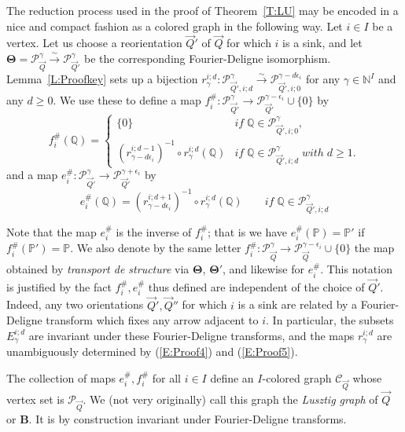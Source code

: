 \documentclass[a4paper,10pt]{amsart}
\def\N{\mathbb{N}}
\def\FD{\boldsymbol{\Theta}}
\numberwithin{equation}{section}
\begin{document}
The reduction process used in the proof of Theorem~\ref{T:LU} may be encoded in a nice and compact fashion as a colored graph in the following way. Let $i \in I$ be a vertex. Let us choose a reorientation $\vec{Q}'$ of $\vec{Q}$ for which $i$ is a sink, and let $\FD=\mathcal{P}_{\vec{Q}}^{\gamma} \stackrel{\sim}{\to} \mathcal{P}_{\vec{Q}'}^{\gamma}$ be the corresponding Fourier-Deligne isomorphism. Lemma~\ref{L:Proofkey} sets up a bijection $r_{\gamma}^{i;d}: \mathcal{P}_{\vec{Q}',i;d}^{\gamma} \stackrel{\sim}{\to} \mathcal{P}_{\vec{Q}',i;0}^{\gamma-d\epsilon_i}$ for any $\gamma \in \N^I$ and any $d \geq 0$. We use these to define a map $f_i^{\#}: \mathcal{P}_{\vec{Q}'}^{\gamma} \to \mathcal{P}_{\vec{Q}'}^{\gamma-\epsilon_i} \cup \{0\}$ by
$$f_i^{\#} (\mathbb{Q})=
\begin{cases} \{0\} & if \;\mathbb{Q} \in \mathcal{P}_{\vec{Q}',i;0}^{\gamma},\\ (r_{\gamma-d\epsilon_i}^{i;d-1})^{-1} \circ r_{\gamma}^{i;d} (\mathbb{Q}) & if\; \mathbb{Q} \in \mathcal{P}_{\vec{Q}',i;d}^{\gamma}\;with\;d \geq 1.
\end{cases}
$$
and a map $e_i^{\#}: \mathcal{P}_{\vec{Q}'}^{\gamma} \to \mathcal{P}_{\vec{Q}'}^{\gamma+\epsilon_i} $ by
$$e_i^{\#} (\mathbb{Q})= (r_{\gamma-d\epsilon_i}^{i;d+1})^{-1} \circ r_{\gamma}^{i;d} (\mathbb{Q}) \qquad if\; \mathbb{Q} \in \mathcal{P}_{\vec{Q}',i;d}^{\gamma}
$$

Note that the map $e_i^{\#}$ is the inverse of $f_i^\#$; that is we have $e_i^\#(\mathbb{P})=\mathbb{P}'$ if $f_i^\#(\mathbb{P}')=\mathbb{P}$. 
We also denote by the same letter $f_i^{\#}: \mathcal{P}_{\vec{Q}}^{\gamma} \to \mathcal{P}_{\vec{Q}}^{\gamma-\epsilon_i} \cup \{0\}$ the map obtained by \textit{transport de structure} via $\FD$, $\FD'$, and likewise for $e_i^\#$. This notation is justified by the fact $f_i^{\#}, e_i^\#$ thus defined are independent of the choice of $\vec{Q}'$. Indeed, any two orientations $\vec{Q}', \vec{Q}''$ for which $i$ is a sink are related by a Fourier-Deligne transform which fixes any arrow adjacent to $i$. In particular, the subsets $E_{\gamma}^{i;d}$ are invariant under these Fourier-Deligne transforms, and the maps $r_{\gamma}^{i;d}$ are unambiguously determined by (\ref{E:Proof4}) and (\ref{E:Proof5}).

\vspace{.1in}

The collection of maps $e_i^\#, f_i^{\#}$ for all $i \in I$ define an $I$-colored graph $\mathcal{C}_{\vec{Q}}$ whose vertex set is $\mathcal{P}_{\vec{Q}}$. We (not very originally) call this graph the \textit{Lusztig graph} of $\vec{Q}$ or $\mathbf{B}$. It is by construction invariant under Fourier-Deligne transforms.
\end{document}
